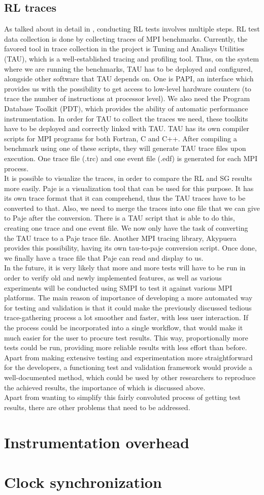 \subsection{RL traces}
As talked about in detail in \cite{ms11}, conducting RL tests involves
multiple steps. RL test data collection is done by collecting traces
of MPI benchmarks. Currently, the favored tool in trace collection in
the project is Tuning and Analisys Utilities (TAU)\cite{sm06}, which
is a well-established tracing and profiling tool. Thus, on the system
where we are running the benchmarks, TAU has to be deployed and
configured, alongside other software that TAU depends on. One is PAPI,
an interface which provides us with the possibility to
get access to low-level hardware counters (to trace the number of
instructions at processor level). We also need the Program Database
Toolkit (PDT), which provides the ability of automatic performance
instrumentation. In order for TAU to collect the traces we need, these
toolkits have to be deployed and correctly linked with TAU. TAU has
its own compiler scripts for MPI programs for both Fortran, C and
C++. After compiling a benchmark using one of these scripts, they will
generate TAU trace files upon execution. One trace file (.trc)
and one event file (.edf) is generated for each MPI process.\\
It is possible to visualize the traces, in order to compare the RL and SG
results more easily. Paje is a visualization tool that can be used for
this purpose. It has its own trace format that it can comprehend, thus
the TAU traces have to be converted to that. Also, we need to merge
the traces into one file that we can give to Paje after the
conversion. There is a
TAU script that is able to do this, creating one trace and one event
file. We now only have the task of converting the TAU trace to a Paje
trace file. Another MPI tracing library, Akypuera provides this
possibility, having its own tau-to-paje conversion script. Once done,
we finally have a trace file that Paje can read and display to us.\\
In the future, it is very likely that more and more tests will have to
be run in order to verify old and newly implemented features, as well
as various experiments will be conducted using SMPI to test it against
various MPI platforms. The main reason of importance of developing a
more automated way for testing and validation is that it could make the
previously discussed tedious trace-gathering process a lot smoother
and faster, with less user interaction. If the process could be
incorporated into a single workflow, that would make it much easier
for the user to procure test results. This way, proportionally more
tests could be run, providing more reliable results with less effort
than before. Apart from making extensive testing and experimentation
more straightforward for the developers, a functioning test and
validation framework would provide a well-documented method, which
could be used by other researchers to reproduce the achieved results,
the importance of which is discussed above.\\
Apart from wanting to simplify this fairly convoluted process of
getting test results, there are other problems that need to be
addressed.
\section{Instrumentation overhead}
\section{Clock synchronization}
